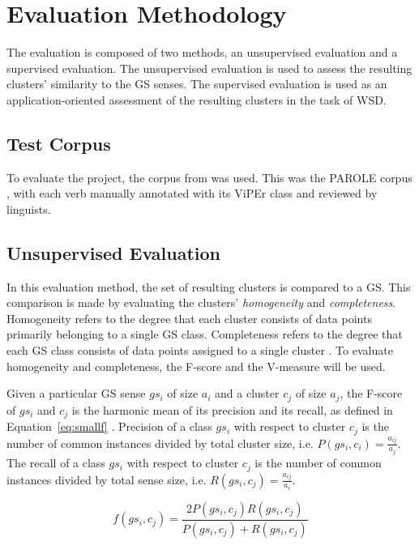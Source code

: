 \chapter{Evaluation Methodology}

The evaluation is composed of two methods, an unsupervised evaluation and a
supervised evaluation. The unsupervised evaluation is used to assess the
resulting clusters' similarity to the \ac{GS} senses. The supervised evaluation
is used as an application-oriented assessment of the resulting clusters in the
task of \ac{WSD}.

\section{Test Corpus}

To evaluate the project, the corpus from \cite{pires2017verb} was used. This was
the PAROLE corpus \cite{nascimento1998parole}, with each verb manually annotated
with its ViPEr class and reviewed by linguists.

\section{Unsupervised Evaluation}
\label{sec:unsupeval}

In this evaluation method, the set of resulting clusters is compared to a
\ac{GS}. This comparison is made by evaluating the clusters'
\textit{homogeneity} and \textit{completeness}. Homogeneity refers to the degree
that each cluster consists of data points primarily belonging to a single
\ac{GS} class. Completeness refers to the degree that each \ac{GS} class
consists of data points assigned to a single cluster
\cite{manandhar2009semeval}. To evaluate homogeneity and completeness, the
F-score and the V-measure will be used.

Given a particular \ac{GS} sense $gs_i$ of size $a_i$ and a cluster $c_j$ of
size $a_j$, the F-score of $gs_i$ and $c_j$ is the harmonic mean of its
precision and its recall, as defined in Equation~\ref{eq:smallf}
\cite{agirre2007semeval}. Precision of a class $gs_i$ with respect to cluster
$c_j$ is the number of common instances divided by total cluster size, i.e.
$P(gs_i, c_i) = \frac{a_{ij}}{a_j}$. The recall of a class $gs_i$ with respect
to cluster $c_j$ is the number of common instances divided by total sense size,
i.e. $R(gs_i, c_j) = \frac{a_ {ij}}{a_i}$.

\begin{equation} \label{eq:smallf}
 f(gs_i, c_j) = \frac{2P(gs_i,c_j)R(gs_i,c_j)}
                     {P(gs_i,c_j) + R(gs_i,c_j)}
\end{equation}

